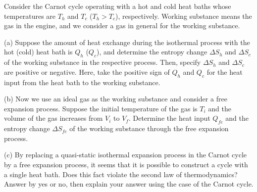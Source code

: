     \begin{example}
        Consider the Carnot cycle operating with a hot and cold heat baths whose temperatures are $T_h$ and
        $T_c$ ($T_h > T_c$), respectively. Working substance means the gas in the engine, and we consider a gas in
        general for the working substance.

        (a) Suppose the amount of heat exchange during the isothermal process with the hot (cold) heat bath is
        $Q_h$ ($Q_c$), and determine the entropy change $\Delta S_h$ and $\Delta S_c$ of the working substance in the respective
        process. Then, specify $\Delta S_h$ and $\Delta S_c$ are positive or negative. Here, take the positive sign of $Q_h$
        and $Q_c$ for the heat input from the heat bath to the working substance.

        (b) Now we use an ideal gas as the working substance and consider a free expansion process. Suppose the
        initial temperature of the gas is $T_i$ and the volume of the gas increases from $V_i$ to $V_f$. Determine the
        heat input $Q_{fe}$ and the entropy change $\Delta S_{fe}$ of the working substance through the free expansion
        process.

        (c) By replacing a quasi-static isothermal expansion process in the Carnot cycle by a free expansion
        process, it seems that it is possible to construct a cycle with a single heat bath. Does this fact
        violate the second law of thermodynamics? Answer by yes or no, then explain your answer using
        the case of the Carnot cycle.
    \end{example}
%